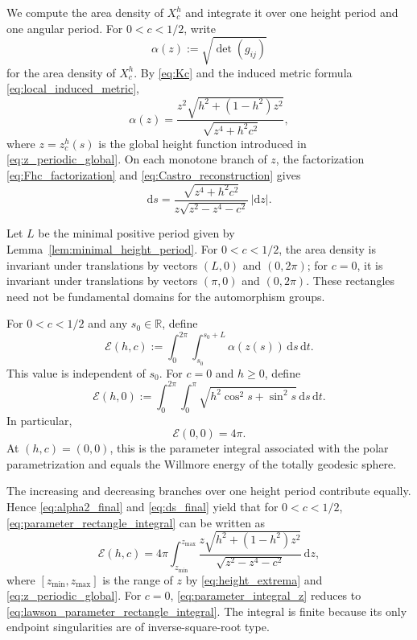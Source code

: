 \documentclass[a4paper,11pt]{amsart}
\numberwithin{equation}{section}
\theoremstyle{plain}
\newcommand{\dif}{\mathrm{d}}
\begin{document}
We compute the area density of $X_c^h$ and integrate it over one height
period and one angular period. For $0<c<1/2$, write
\[
\alpha(z):=\sqrt{\det(g_{ij})}
\]
for the area density of $X_c^h$. By \eqref{eq:Kc} and the induced metric
formula \eqref{eq:local_induced_metric},
\begin{equation}\label{eq:alpha2_final}
\alpha(z)
=
\frac{z^2\sqrt{h^2+(1-h^2)z^2}}{\sqrt{z^4+h^2c^2}},
\end{equation}
where $z=z_c^h(s)$ is the global height function introduced in \eqref{eq:z_periodic_global}.
On each monotone branch of $z$, the factorization
\eqref{eq:Fhc_factorization} and \eqref{eq:Castro_reconstruction} gives
\begin{equation}\label{eq:ds_final}
\dif s
=
\frac{\sqrt{z^4+h^2c^2}}
{z\sqrt{z^2-z^4-c^2}}\,|\dif z|.
\end{equation}

Let $L$ be the minimal positive period given by
Lemma~\ref{lem:minimal_height_period}. For $0<c<1/2$, the area density is
invariant under translations by vectors $(L,0)$ and $(0,2\pi)$; for $c=0$, it is
invariant under translations by vectors $(\pi,0)$ and $(0,2\pi)$. These rectangles
need not be fundamental domains for the automorphism groups.

For $0<c<1/2$ and any $s_0\in\mathbb R$, define
\begin{equation}\label{eq:parameter_rectangle_integral}
\mathcal E(h,c)
:=
\int_0^{2\pi}\int_{s_0}^{s_0+L}\alpha(z(s))\,\dif s\,\dif t.
\end{equation}
This value is independent of $s_0$. For $c=0$ and $h\geq0$, define
\begin{equation}\label{eq:lawson_parameter_rectangle_integral}
\mathcal E(h,0)
:=
\int_0^{2\pi}\int_0^\pi
\sqrt{h^2\cos^2s+\sin^2s}\,\dif s\,\dif t.
\end{equation}
In particular,
\begin{equation}\label{eq:sphere_parameter_integral}
\mathcal E(0,0)=4\pi.
\end{equation}
At $(h,c)=(0,0)$, this is the parameter integral associated with the
polar parametrization and equals the Willmore energy of the totally
geodesic sphere.

The increasing and decreasing branches over one height period contribute
equally. Hence \eqref{eq:alpha2_final} and \eqref{eq:ds_final} yield that for $0<c<1/2$, \eqref{eq:parameter_rectangle_integral} can be written as
\begin{equation}\label{eq:parameter_integral_z}
\mathcal E(h,c)
=
4\pi\int_{z_{\min}}^{z_{\max}}
\frac{z\sqrt{h^2+(1-h^2)z^2}}
{\sqrt{z^2-z^4-c^2}}\,\dif z,
\end{equation}
where $[z_{\min},z_{\max}]$ is the range of $z$ by \eqref{eq:height_extrema} and \eqref{eq:z_periodic_global}. For $c=0$, \eqref{eq:parameter_integral_z} reduces to \eqref{eq:lawson_parameter_rectangle_integral}. 
The integral is finite because its only endpoint singularities are of
inverse-square-root type.
\end{document}
